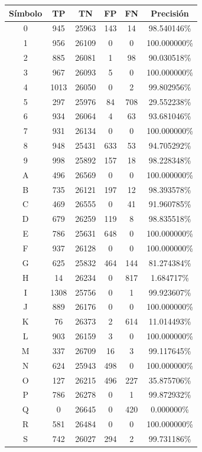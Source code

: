\documentclass[a4paper, 11pt, oneside]{report}
\begin{document}
\begin{table}
\centering
\begin{tabular}{|c|c|c|c|c|c|}
\hline
Símbolo & TP & TN & FP & FN & Precisión \\ 
\hline
0 & 945 & 25963 & 143 & 14 & 98.540146\% \\ 
1 & 956 & 26109 & 0 & 0 & 100.000000\% \\ 
2 & 885 & 26081 & 1 & 98 & 90.030518\% \\ 
3 & 967 & 26093 & 5 & 0 & 100.000000\% \\ 
4 & 1013 & 26050 & 0 & 2 & 99.802956\% \\ 
5 & 297 & 25976 & 84 & 708 & 29.552238\% \\ 
6 & 934 & 26064 & 4 & 63 & 93.681046\% \\ 
7 & 931 & 26134 & 0 & 0 & 100.000000\% \\ 
8 & 948 & 25431 & 633 & 53 & 94.705292\% \\ 
9 & 998 & 25892 & 157 & 18 & 98.228348\% \\ 
A & 496 & 26569 & 0 & 0 & 100.000000\% \\ 
B & 735 & 26121 & 197 & 12 & 98.393578\% \\ 
C & 469 & 26555 & 0 & 41 & 91.960785\% \\ 
D & 679 & 26259 & 119 & 8 & 98.835518\% \\ 
E & 786 & 25631 & 648 & 0 & 100.000000\% \\ 
F & 937 & 26128 & 0 & 0 & 100.000000\% \\ 
G & 625 & 25832 & 464 & 144 & 81.274384\% \\ 
H & 14 & 26234 & 0 & 817 & 1.684717\% \\ 
I & 1308 & 25756 & 0 & 1 & 99.923607\% \\ 
J & 889 & 26176 & 0 & 0 & 100.000000\% \\ 
K & 76 & 26373 & 2 & 614 & 11.014493\% \\ 
L & 903 & 26159 & 3 & 0 & 100.000000\% \\ 
M & 337 & 26709 & 16 & 3 & 99.117645\% \\ 
N & 624 & 25943 & 498 & 0 & 100.000000\% \\ 
O & 127 & 26215 & 496 & 227 & 35.875706\% \\ 
P & 786 & 26278 & 0 & 1 & 99.872932\% \\ 
Q & 0 & 26645 & 0 & 420 & 0.000000\% \\ 
R & 581 & 26484 & 0 & 0 & 100.000000\% \\ 
S & 742 & 26027 & 294 & 2 & 99.731186\% \\ 

\end{tabular}
\end{table}
\end{document}
